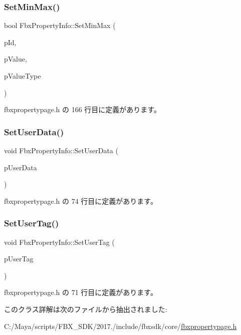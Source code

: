 \subsubsection{\texorpdfstring{Set\+Min\+Max()}{SetMinMax()}}
{\footnotesize\ttfamily bool Fbx\+Property\+Info\+::\+Set\+Min\+Max (\begin{DoxyParamCaption}\item[{\hyperlink{class_fbx_property_info_a83069f079a29bde133f2e9324de5af43}{E\+Value\+Index}}]{p\+Id,  }\item[{const void $\ast$}]{p\+Value,  }\item[{\hyperlink{fbxpropertytypes_8h_a73913a5ddfb20e57c6f25e9e6784bd92}{E\+Fbx\+Type}}]{p\+Value\+Type }\end{DoxyParamCaption})\hspace{0.3cm}{\ttfamily [inline]}}



 fbxpropertypage.\+h の 166 行目に定義があります。

\mbox{\label{class_fbx_property_info_aab80f1b62d49a915018ea8aad93a2a77}} 
\subsubsection{\texorpdfstring{Set\+User\+Data()}{SetUserData()}}
{\footnotesize\ttfamily void Fbx\+Property\+Info\+::\+Set\+User\+Data (\begin{DoxyParamCaption}\item[{const void $\ast$}]{p\+User\+Data }\end{DoxyParamCaption})\hspace{0.3cm}{\ttfamily [inline]}}



 fbxpropertypage.\+h の 74 行目に定義があります。

\mbox{\label{class_fbx_property_info_af602f7b028dd1d1c43f5181650ddda5e}} 
\subsubsection{\texorpdfstring{Set\+User\+Tag()}{SetUserTag()}}
{\footnotesize\ttfamily void Fbx\+Property\+Info\+::\+Set\+User\+Tag (\begin{DoxyParamCaption}\item[{int}]{p\+User\+Tag }\end{DoxyParamCaption})\hspace{0.3cm}{\ttfamily [inline]}}



 fbxpropertypage.\+h の 71 行目に定義があります。



このクラス詳解は次のファイルから抽出されました\+:\begin{DoxyCompactItemize}
\item 
C\+:/\+Maya/scripts/\+F\+B\+X\+\_\+\+S\+D\+K/2017./include/fbxsdk/core/\hyperlink{fbxpropertypage_8h}{fbxpropertypage.\+h}\end{DoxyCompactItemize}
